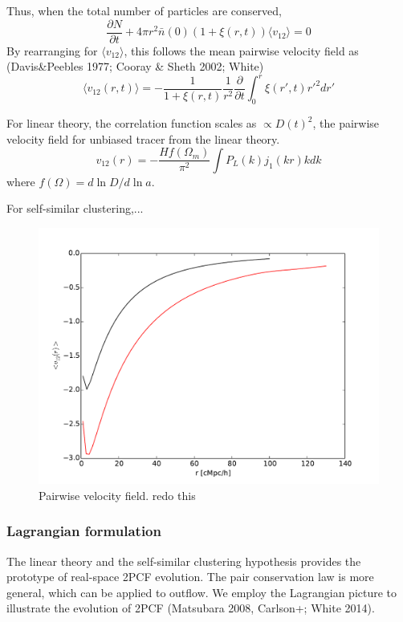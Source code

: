 \documentclass[useAMS,usenatbib,twocolumn]{mn2e}
\begin{document}
Thus, when the total number of particles are conserved,
\begin{equation}
\frac{\partial N}{\partial t}+
4\pi r^2\bar{n}(0)(1+\xi(r,t))\langle v_{12}\rangle=0
\end{equation}
By rearranging for $\langle v_{12}\rangle$, this follows the mean pairwise 
velocity field as (Davis\&Peebles 1977; Cooray \& Sheth 2002; White)
\begin{equation}
\langle v_{12}(r,t)\rangle=-\frac{1}{1+\xi(r,t)}\frac{1}{r^2}
\frac{\partial}{\partial t}\int_0^r\xi(r',t)r'^2dr'
\end{equation}





For linear theory, the correlation function scales as $\propto D(t)^2$,
the pairwise velocity field for unbiased tracer from the linear theory.
\begin{equation}
v_{12}(r)=-\frac{Hf(\Omega_m)}{\pi^2}\int P_L(k)j_1(kr) kdk
\end{equation}
where $f(\Omega)=d\ln D/d\ln a$.


For self-similar clustering,...

\begin{figure}
 \begin{center}
  \includegraphics[angle=0,width=\columnwidth]{figure/v12.pdf}
  \caption{Pairwise velocity field. redo this}
 \end{center}
\end{figure}

\subsubsection{Lagrangian formulation}
The linear theory and the self-similar clustering hypothesis provides
the prototype of real-space 2PCF evolution. The pair conservation law is
more general, which can be applied to outflow. We employ the Lagrangian
picture to illustrate the evolution of 2PCF (Matsubara 2008, Carlson+;
White 2014). 
\end{document}
